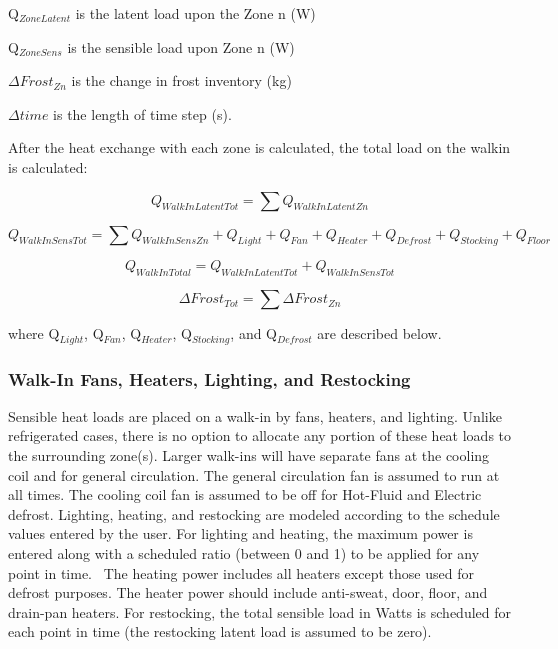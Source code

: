 Q\(_{ZoneLatent}\) is the latent load upon the Zone n (W)

Q\(_{ZoneSens}\) is the sensible load upon Zone n (W)

\(\Delta Frost_{Zn}\) is the change in frost inventory (kg)

\(\Delta time\) is the length of time step (s).

After the heat exchange with each zone is calculated, the total load on the walkin is calculated:

\begin{equation}
Q_{WalkInLatentTot} = \sum Q_{WalkInLatentZn}
\end{equation}

\begin{equation}
Q_{WalkInSensTot} = \sum Q_{WalkInSensZn} + Q_{Light} + Q_{Fan} + Q_{Heater} + Q_{Defrost} + Q_{Stocking} + Q_{Floor}
\end{equation}

\begin{equation}
Q_{WalkInTotal} = Q_{WalkInLatentTot} + Q_{WalkInSensTot}
\end{equation}

\begin{equation}
\Delta Frost_{Tot} = \sum \Delta Frost_{Zn}
\end{equation}

where Q\(_{Light}\), Q\(_{Fan}\), Q\(_{Heater}\), Q\(_{Stocking}\), and Q\(_{Defrost}\) are described below.

\subsubsection{Walk-In Fans, Heaters, Lighting, and Restocking}\label{walk-in-fans-heaters-lighting-and-restocking}

Sensible heat loads are placed on a walk-in by fans, heaters, and lighting. Unlike refrigerated cases, there is no option to allocate any portion of these heat loads to the surrounding zone(s). Larger walk-ins will have separate fans at the cooling coil and for general circulation. The general circulation fan is assumed to run at all times. The cooling coil fan is assumed to be off for Hot-Fluid and Electric defrost. Lighting, heating, and restocking are modeled according to the schedule values entered by the user. For lighting and heating, the maximum power is entered along with a scheduled ratio (between 0 and 1) to be applied for any point in time.~ The heating power includes all heaters except those used for defrost purposes. The heater power should include anti-sweat, door, floor, and drain-pan heaters. For restocking, the total sensible load in Watts is scheduled for each point in time (the restocking latent load is assumed to be zero).

